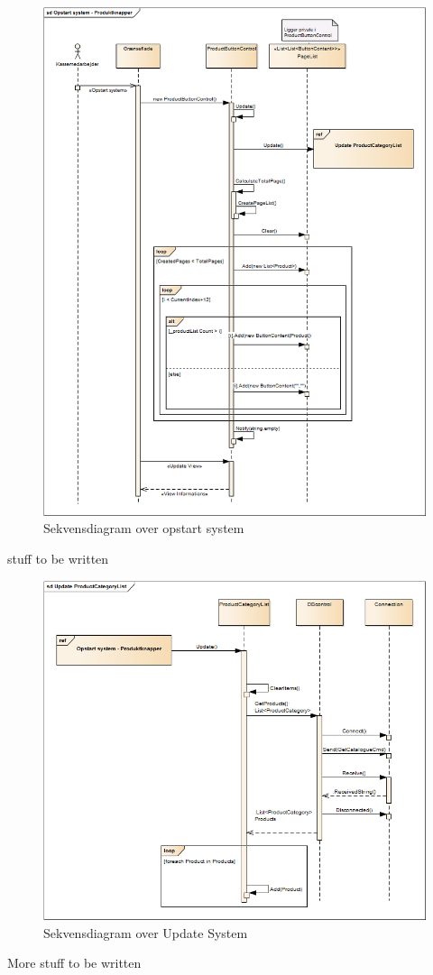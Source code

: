\begin{figure}[H]
	\centering
	\includegraphics[width=1\textwidth]{Systemdesign/Frontend/GUI/DesignOgStruktur/Pics/OpstartSystem}
	\caption{Sekvensdiagram over opstart system}
	\label{fig:SekvensOpstart}
\end{figure}

stuff to be written

\begin{figure}[H]
	\centering
	\includegraphics[width=1\textwidth]{Systemdesign/Frontend/GUI/DesignOgStruktur/Pics/UpdateProductCategoryList}
	\caption{Sekvensdiagram over Update System}
	\label{fig:SekvensUpdate}
\end{figure}

More stuff to be written

\newpage
